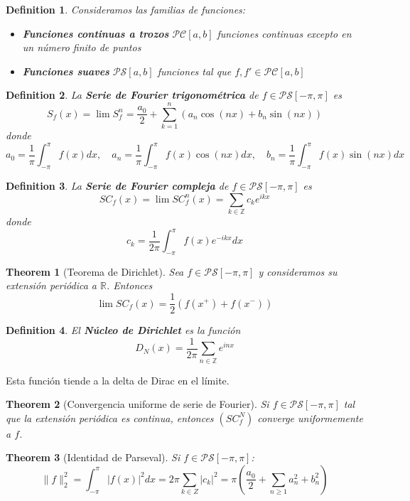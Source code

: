 \documentclass[leqno]{article}
\newtheorem*{definition}{Definition}
\newtheorem*{theorem}{Theorem}
\begin{document}
\begin{definition} Consideramos las familias de funciones:
\begin{itemize}[topsep=-6pt, itemsep=0pt]
  \item \textbf{Funciones continuas a trozos} $\mathcal{PC}[a, b]$ funciones continuas excepto en un número finito de puntos
  \item \textbf{Funciones suaves} $\mathcal{PS}[a, b]$ funciones tal que $f, f' \in \mathcal{PC}[a, b]$
\end{itemize}
\end{definition}

\begin{definition}
La \textbf{Serie de Fourier trigonométrica} de $f\in \mathcal{PS}[-\pi, \pi]$ es
\[
S_f(x) = \lim S_f^n = \frac{a_0}{2} +  \sum_{k = 1}^n \left( a_n \cos(nx) + b_n\sin(nx)  \right)  
\] 
donde 
\[
a_0 = \frac{1}{\pi} \int_{-\pi}^\pi f(x) dx, \quad a_n = \frac{1}{\pi}\int_{-\pi}^\pi f(x)\cos(nx)dx, \quad b_n = \frac{1}{\pi}\int_{-\pi}^\pi f(x)\sin(nx)dx
\] 
\end{definition}

\begin{definition}
La \textbf{Serie de Fourier compleja} de $f\in \mathcal{PS}[-\pi, \pi]$ es
\[
SC_f(x) = \lim SC_f^n (x) = \sum_{k \in \mathbb{Z}} c_{k}e^{ikx} 
\] 
donde 
\[
c_k = \frac{1}{2\pi} \int_{-\pi}^\pi f(x)e^{-ikx}dx
\] 
\end{definition}

\begin{theorem}[Teorema de Dirichlet]
Sea $f\in \mathcal{PS}[-\pi, \pi]$ y consideramos su extensión periódica a $\mathbb{R}$. Entonces
\[
\lim SC_{f}(x) = \frac{1}{2}\left( f(x^+) + f(x^-) \right) 
\] 
\end{theorem}

\begin{definition}
El \textbf{Núcleo de Dirichlet} es la función
 \[
D_N (x) = \frac{1}{2\pi}\sum_{n\in \mathbb{Z}}e^{inx}
\] 
\end{definition}

Esta función tiende a la delta de Dirac en el límite.

\begin{theorem}[Convergencia uniforme de serie de Fourier]
  Si $f\in \mathcal{PS}[-\pi, \pi]$ tal que la extensión periódica es continua, entonces $(SC_f^N)$ converge uniformemente a $f$.
\end{theorem}

\begin{theorem}[Identidad de Parseval] Si $f\in \mathcal{PS}[-\pi, \pi]$:
  \[
  \|f\|_2^2 = \int_{-\pi}^\pi |f(x)|^2dx = 2\pi \sum_{k\in Z} |c_k|^2 = \pi \left( \frac{a_0}{2} + \sum_{n\ge 1} a_n^2 + b_n^2 \right) 
  \] 
\end{theorem}
\end{document}
